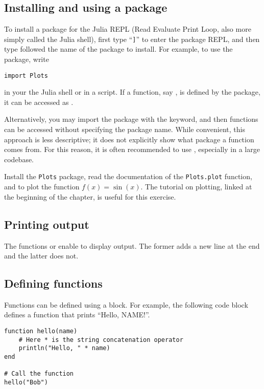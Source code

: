 \subsection*{Installing and using a package}%
\label{sub:installing_and_using_a_package}
To install a package for the Julia REPL (Read Evaluate Print Loop, also more simply called the Julia shell),
first type ``\texttt{]}'' to enter the package REPL,
and then type  followed the name of the package to install.
For example, to use the  package, write
\begin{verbatim}
import Plots
\end{verbatim}
in your the Julia shell or in a script.
If a function, say , is defined by the package,
it can be accessed as .

Alternatively, you may import the package with the  keyword,
and then functions can be accessed without specifying the package name.
While convenient, this approach is less descriptive;
it does not explicitly show what package a function comes from.
For this reason, it is often recommended to use ,
especially in a large codebase.

\begin{task}
    Install the \texttt{Plots} package,
    read the documentation of the \texttt{Plots.plot} function,
    and to plot the function $f(x) = \sin(x)$.
    The tutorial on plotting, linked at the beginning of the chapter,
    is useful for this exercise.
\end{task}

\subsection*{Printing output}%
The functions  or  enable to display output.
The former adds a new line at the end and the latter does not.


\subsection*{Defining functions}%
\label{sub:defining_functions}
Functions can be defined using a  block.
For example, the following code block defines a function that prints ``Hello, NAME!''.

\begin{verbatim}
function hello(name)
    # Here * is the string concatenation operator
    println("Hello, " * name)
end

# Call the function
hello("Bob")
\end{verbatim}

